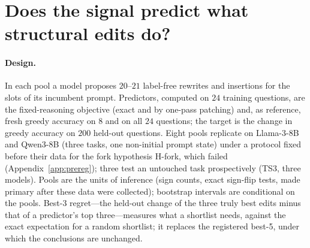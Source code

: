 \section{Does the signal predict what structural edits do?}
\label{sec:diagnosis}

\paragraph{Design.} In each pool a model proposes $20$--$21$ label-free rewrites and insertions for
the slots of its incumbent prompt. Predictors, computed on $24$ training questions, are the
fixed-reasoning objective (exact and by one-pass patching) and, as reference, fresh greedy accuracy
on $8$ and on all $24$ questions; the target is the change in greedy accuracy on $200$ held-out
questions. Eight pools replicate on
Llama-3-8B and Qwen3-8B (three tasks, one non-initial prompt state) under a protocol fixed before
their data for the fork hypothesis H-fork, which failed (Appendix~\ref{app:prereg}); three test an
untouched task prospectively (TS3, three models). Pools are the units of inference (sign counts,
exact sign-flip tests, made primary after these data were collected); bootstrap intervals are
conditional on the pools. Best-3 regret---the held-out change of the three truly best edits minus
that of a predictor's top three---measures what a shortlist needs, against the exact expectation for
a random shortlist; it replaces the registered best-5, under which the conclusions are unchanged.

\begin{table}[t]
\centering
\caption{\textbf{Spearman correlation between each predictor and the held-out accuracy change of
LLM-proposed block edits} (pooled: mean over pools, $95\%$ bias-corrected paired bootstrap interval over questions,
conditional on the pools). Answer: the fixed-reasoning objective; Fork: decision margin at
reasoning forks (failed preregistered repair, Appendix~\ref{app:prereg}); each exact or patched
(Eq.~\ref{eq:patch}). Fresh $n$ rows: fresh greedy accuracy on $n$ training questions. LD3/LD7:
logical deduction (3/7 objects); TS7/TS3: tracking shuffled objects (7/3; TS3 untouched). L/Q/G:
Llama-3-8B/Qwen3-8B/Gemma-2-9B; $^\ast$: non-initial prompt state; $\sqrt\kappa$: reliability bound
of the target (Appendix~\ref{app:details}); cost: seconds per pool on one A6000.}
\label{tab:validity}
\resizebox{0.88\textwidth}{!}{}
\end{table}

